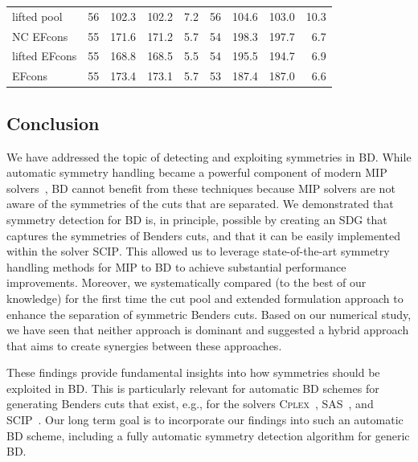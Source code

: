 \documentclass[a4paper,10pt]{article}
\newcommand{\solver}[1]{\textsc{#1}}
\newcommand{\scip}{\solver{SCIP}\xspace}
\theoremstyle{definition}
\begin{document}
\begin{table}[t]
\begin{scriptsize}
\begin{tabular*}{\textwidth}{@{}l@{\;\;\extracolsep{\fill}}rrrrrrrr@{}}
    lifted pool & \num{ 56} & \num{ 102.3} & \num{ 102.2} & \num{       7.2} & \num{ 56} & \num{ 104.6} & \num{ 103.0} & \num{      10.3} \\
    NC EFcons & \num{ 55} & \num{ 171.6} & \num{ 171.2} & \num{       5.7} & \num{ 54} & \num{ 198.3} & \num{ 197.7} & \num{       6.7} \\
    lifted EFcons & \num{ 55} & \num{ 168.8} & \num{ 168.5} & \num{       5.5} & \num{ 54} & \num{ 195.5} & \num{ 194.7} & \num{       6.9} \\
    EFcons & \num{ 55} & \num{ 173.4} & \num{ 173.1} & \num{       5.7} & \num{ 53} & \num{ 187.4} & \num{ 187.0} & \num{       6.6} \\
    \bottomrule
  \end{tabular*}
  \end{scriptsize}
\end{table}

\subsection*{Conclusion}
We have addressed the topic of detecting and exploiting symmetries in BD.
While automatic symmetry handling became a powerful component of modern MIP solvers~\cite{PfetschRehn2019}, BD cannot benefit from these techniques because MIP solvers are not aware of the symmetries of the cuts that are separated.
We demonstrated that symmetry detection for BD is, in principle, possible by creating an SDG that captures the symmetries of Benders cuts, and that it can be easily implemented within the solver \scip.
This allowed us to leverage state-of-the-art symmetry handling methods for MIP to BD to achieve substantial performance improvements.
Moreover, we systematically compared (to the best of our knowledge) for the first time the cut pool and extended formulation approach to enhance the separation of symmetric Benders cuts.
Based on our numerical study, we have seen that neither approach is dominant and suggested a hybrid approach that aims to create synergies between these approaches.

These findings provide fundamental insights into how symmetries should be exploited in BD.
This is particularly relevant for automatic BD schemes for generating Benders cuts that exist, e.g., for the solvers \solver{Cplex}~\cite{BonamiEtAl2020}, \solver{SAS}~\cite{SAS}, and \scip~\cite{Maher2021}.
Our long term goal is to incorporate our findings into such an automatic BD scheme, including a fully automatic symmetry detection algorithm for generic BD.
%
%


\end{document}
